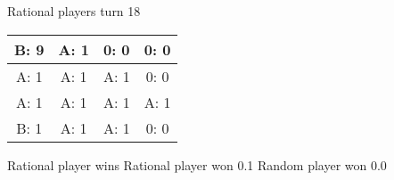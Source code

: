 \documentclass[12pt]{article}
\begin{document}
Rational players turn 18
\begin{center}
\begin{tabular}{|c|c|c|c|} 
\hline
B: 9  & A: 1  & 0: 0  & 0: 0  \\ \hline
A: 1  & A: 1  & A: 1  & 0: 0  \\ \hline
A: 1  & A: 1  & A: 1  & A: 1  \\ \hline
B: 1  & A: 1  & A: 1  & 0: 0  \\ \hline
\end{tabular} 
\end{center}
Rational player wins
Rational player won 0.1
Random player won 0.0
\end{document}
